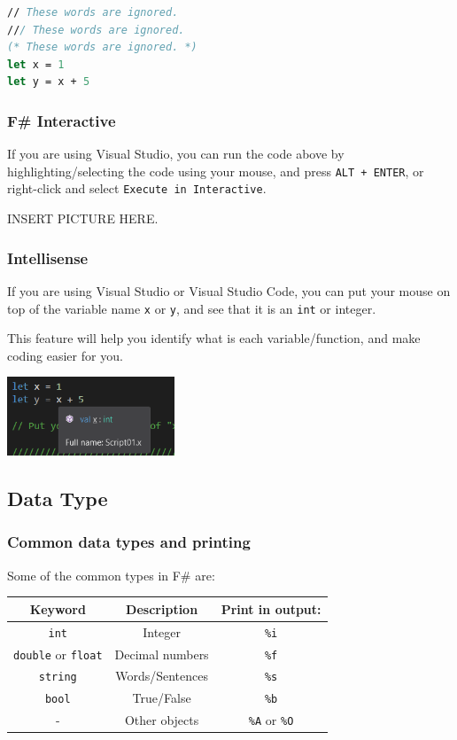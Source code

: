 \documentclass[12pt]{article}
\begin{document}
\begin{lstlisting}[language=FSharp]
// These words are ignored.
/// These words are ignored.
(* These words are ignored. *)
let x = 1
let y = x + 5
\end{lstlisting}

\subsubsection{F\# Interactive}

If you are using Visual Studio, you can run the code above by highlighting/selecting the code using your mouse, and press \texttt{ALT + ENTER}, or right-click and select \texttt{Execute in Interactive}.

\begin{center}
INSERT PICTURE HERE.
\end{center}
\vfill

\pagebreak

\subsubsection{Intellisense}
If you are using Visual Studio or Visual Studio Code, you can put your mouse on top of the variable name \texttt{x} or \texttt{y}, and see that it is an \texttt{int} or integer.

This feature will help you identify what is each variable/function, and make coding easier for you. 
\begin{center}
\includegraphics[width=5cm]{pictures/picture01.png}
\end{center}
\subsection{Data Type}

\subsubsection{Common data types and printing}

Some of the common types in F\# are:
\begin{center}
\begin{tabular}{|c|c|c|}
\hline Keyword & Description & Print in output:
\\ \hline \texttt{int} & Integer & \texttt{\%i}
\\ \hline \texttt{double} or \texttt{float} & Decimal numbers & \texttt{\%f}
\\ \hline \texttt{string} & Words/Sentences & \texttt{\%s}
\\ \hline \texttt{bool} & True/False & \texttt{\%b}
\\ \hline - & Other objects & \texttt{\%A} or \texttt{\%O}
\\ \hline
\end{tabular}
\end{center}
\end{document}

